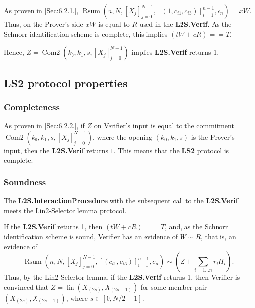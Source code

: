 \documentclass{mathcryptology} %
\DeclareMathOperator{\lin}{lin}
\DeclareMathOperator{\Rsum}{Rsum}
\DeclareMathOperator{\ComTwo}{Com2}
\theoremstyle{title}
\theoremstyle{titleof}
\begin{document}
    As proven in \ref{Sec:6.2.1.}, $\Rsum\left(n, N, {\left[X_{j}\right]}_{j=0}^{N-1},{\left[\left(1,c_{i1}, c_{i3}\right)\right]}_{i=1}^{n-1},c_{n}\right)=xW$. Thus, on the Prover's side $xW$ is equal to $R$ used in the \textbf{L2S.Verif}.
    As the Schnorr identification scheme \cite{16} is complete, this implies $\left(tW+cR\right)==T$.

    Hence, $Z=\ComTwo\left(k_{0}, k_{1}, s, {\left[X_{j}\right]}_{j=0}^{N-1}\right)$ implies \textbf{L2S.Verif} returns 1.


\subsection{LS2 protocol properties}


\subsubsection{Completeness}
    As proven in \ref{Sec:6.2.2.}, if $Z$ on Verifier's input is equal to the commitment $\ComTwo\left(k_{0}, k_{1}, s, {\left[X_{j}\right]}_{j=0}^{N-1}\right)$, where the opening $\left(k_{0}, k_{1}, s\right)$ is the Prover's input, then the \textbf{L2S.Verif} returns $1$.
    This means that the \textbf{LS2} protocol is complete.


\subsubsection{Soundness}
    The \textbf{L2S.InteractionProcedure} with the subsequent call to the \textbf{L2S.Verif} meets the Lin2-Selector lemma protocol.

    If the \textbf{L2S.Verif} returns 1, then $\left(tW+cR\right)==T$, and, as the Schnorr identification scheme is sound, Verifier has an evidence of $W\sim R$, that is, an evidence of
    \begin{equation*}
        \Rsum\left(n, N, {\left[X_{j}\right]}_{j=0}^{N-1}, {\left[\left(c_{i1}, c_{i3}\right)\right]}_{i=1}^{n-1}, c_{n}\right) \sim  \left(Z+\sum_{i=1\dots{}n} r_i H_i\right).
    \end{equation*}
    Thus, by the Lin2-Selector lemma, if the \textbf{L2S.Verif} returns 1, then Verifier is convinced that $Z = \lin\left(X_{\left(2s\right)}, X_{\left(2s+1\right)}\right)$ for some member-pair $\left(X_{\left(2s\right)}, X_{\left(2s+1\right)}\right)$, where $s\in\left[0,N/2-1\right]$.
\end{document}
